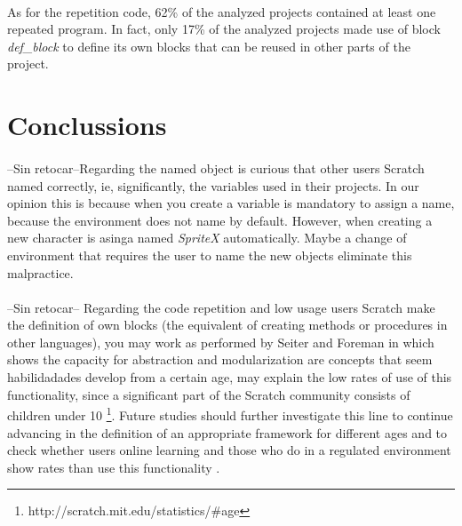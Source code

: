 \documentclass[a4paper,10pt]{article}
\begin{document}
\paragraph{}As for the repetition code, 62\% of the analyzed projects contained at least one repeated program. In fact, only 17\% of the analyzed projects made use of block \textit{def\_block} to define its own blocks that can be reused in other parts of the project. 

\section{Conclussions}

\paragraph{} --Sin retocar--Regarding the named object is curious that other users Scratch named correctly, ie, significantly, the variables used in their projects. In our opinion this is because when you create a variable is mandatory to assign a name, because the environment does not name by default. However, when creating a new character is asinga named \textit{SpriteX} automatically. Maybe a change of environment that requires the user to name the new objects eliminate this malpractice.
\paragraph{} --Sin retocar-- Regarding the code repetition and low usage users Scratch make the definition of own blocks (the equivalent of creating methods or procedures in other languages), you may work as performed by Seiter and Foreman \cite {seiter2013modeling} in which shows the capacity for abstraction and modularization are concepts that seem habilidadades develop from a certain age, may explain the low rates of use of this functionality, since a significant part of the Scratch community consists of children under 10 \footnote{http://scratch.mit.edu/statistics/\#age}. Future studies should further investigate this line to continue advancing in the definition of an appropriate framework for different ages and to check whether users online learning and those who do in a regulated environment show rates than use this functionality .

\newpage


\end{document}

